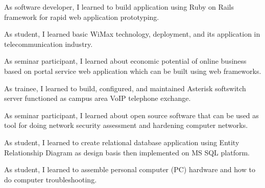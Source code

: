 \documentclass[10pt, a4paper]{moderncv}
\begin{document}
{
    \begin{scriptsize}
        As software developer, I learned to build application using Ruby on Rails framework for rapid web application prototyping.
    \end{scriptsize}
}
{
    \begin{scriptsize}
        As student, I learned basic WiMax technology, deployment, and its application in telecommunication industry.
    \end{scriptsize}
}
{
    \begin{scriptsize}
        As seminar participant, I learned about economic potential of online business based on portal service web application which can be built
        using web frameworks.
    \end{scriptsize}
}
{
    \begin{scriptsize}
        As trainee, I learned to build, configured, and maintained Asterisk softswitch server functioned as campus area VoIP telephone exchange.
    \end{scriptsize}
}
{
    \begin{scriptsize}
        As seminar participant, I learned about open source software that can be used as tool for doing network security assessment and hardening
        computer networks.
    \end{scriptsize}
}
{
    \begin{scriptsize}
        As student, I learned to create relational database application using Entity Relationship Diagram as design basis then implemented on MS SQL platform.
    \end{scriptsize}
}
{
    \begin{scriptsize}
        As student, I learned to assemble personal computer (PC) hardware and how to do computer troubleshooting.
    \end{scriptsize}
}
\end{document}
